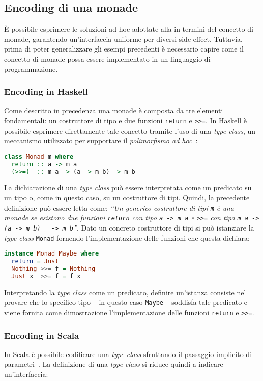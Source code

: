 \subsection{Encoding di una monade}
È possibile esprimere le soluzioni ad hoc adottate alla  in termini del concetto di monade, garantendo un'interfaccia uniforme per diversi side effect.
Tuttavia, prima di poter generalizzare gli esempi precedenti è necessario capire come il concetto di monade possa essere implementato in un linguaggio di programmazione.

\subsubsection{Encoding in Haskell}
Come descritto in precedenza una monade è composta da tre elementi fondamentali: un costruttore di tipo e due funzioni \lstinline{return} e \lstinline{>>=}. In Haskell è possibile esprimere direttamente tale concetto tramite l'uso di una \emph{type class}, un meccanismo utilizzato per supportare il \emph{polimorfismo ad hoc}~\cite{cit:type-classes-in-haskell}:
\begin{lstlisting}[language=haskell]
class Monad m where
  return :: a -> m a
  (>>=)  :: m a -> (a -> m b) -> m b
\end{lstlisting}

La dichiarazione di una \emph{type class} può essere interpretata come un predicato su un tipo o, come in questo caso, su un costruttore di tipi.
Quindi, la precedente definizione può essere letta come: \emph{``Un generico costruttore di tipi \lstinline{m} è una monade se esistono due funzioni \lstinline{return} con tipo \lstinline{a -> m a} e \lstinline{>>=} con tipo \lstinline{m a -> (a -> m b)   -> m b}''}.
Dato un concreto costruttore di tipi si può istanziare la \emph{type class} \lstinline{Monad} fornendo l'implementazione delle funzioni che questa dichiara:
\begin{lstlisting}[language=haskell]
instance Monad Maybe where
  return = Just
  Nothing >>= f = Nothing
  Just x  >>= f = f x
\end{lstlisting}

Interpretando la \emph{type class} come un predicato, definire un'istanza consiste nel provare che lo specifico tipo -- in questo caso \lstinline{Maybe} -- soddisfa tale predicato e viene fornita come dimostrazione l'implementazione delle funzioni \lstinline{return} e \lstinline{>>=}.

\subsubsection{Encoding in Scala}
In Scala è possibile codificare una \emph{type class} sfruttando il passaggio implicito di parametri~\cite{cit:type-classes-as-objects-and-implicits}. La definizione di una \emph{type class} si riduce quindi a indicare un'interfaccia:

